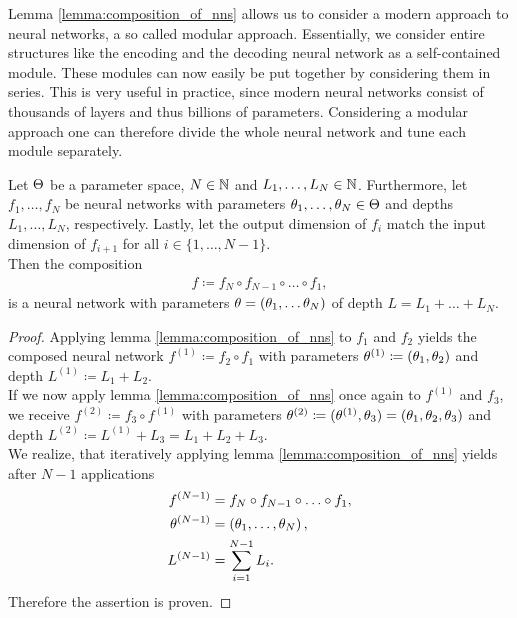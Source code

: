 Lemma \ref{lemma:composition_of_nns} allows us to consider a modern approach to neural networks, a so called modular approach. Essentially, we consider entire structures like the encoding and the decoding neural network as a self-contained module. These modules can now easily be put together by considering them in series. This is very useful in practice, since modern neural networks consist of thousands of layers and thus billions of parameters. Considering a modular approach one can therefore divide the whole neural network and tune each module separately.


\begin{theorem}
Let $\operatorname{\Theta}$ be a parameter space, $N\in \operatorname{\mathbb{N}}$ and $L_1,\ldots,L_N\in \operatorname{\mathbb{N}}$. Furthermore, let $f_1,\ldots,f_N$ be neural networks with parameters $\theta_1,\ldots,\theta_N\in\operatorname{\Theta}$ and depths $L_1,\ldots,L_N$, respectively. Lastly, let the output dimension of $f_i$ match the input dimension of $f_{i+1}$ for all $i\in\{1,\ldots,N-1\}$.\\
Then the composition
\begin{align*}
f \coloneqq f_{N} \circ f_{N-1} \circ \ldots \circ f_1,
\end{align*}
is a neural network with parameters $\theta = (\theta_1,\ldots\theta_N)$ of depth $L = L_1 + \ldots + L_N$.
\end{theorem}


\begin{proof}
Applying lemma \ref{lemma:composition_of_nns} to $f_1$ and $f_2$ yields the composed neural network $f^{(1)} \coloneqq f_2 \circ f_1$ with parameters $\theta^{(1)} \coloneqq (\theta_1, \theta_2)$ and depth $L^{(1)}\coloneqq L_1 + L_2$.\\
If we now apply lemma \ref{lemma:composition_of_nns} once again to $f^{(1)}$ and $f_3$, we receive $f^{(2)} \coloneqq f_3 \circ f^{(1)}$ with parameters $\theta^{(2)} \coloneqq (\theta^{(1)}, \theta_3) = (\theta_1, \theta_2, \theta_3)$ and depth $L^{(2)}\coloneqq L^{(1)} + L_3 = L_1 + L_2 + L_3$.\\
We realize, that iteratively applying lemma \ref{lemma:composition_of_nns} yields  after $N-1$ applications
\begin{align*}
f^{(N-1)} &= f_{N} \circ f_{N-1} \circ \ldots \circ f_1,\\
\theta^{(N-1)}&= \left(\theta_1, \ldots, \theta_N \right),\\
L^{(N-1)} &= \sum_{i=1}^{N-1} L_i.
\end{align*}
Therefore the assertion is proven.
\end{proof}


